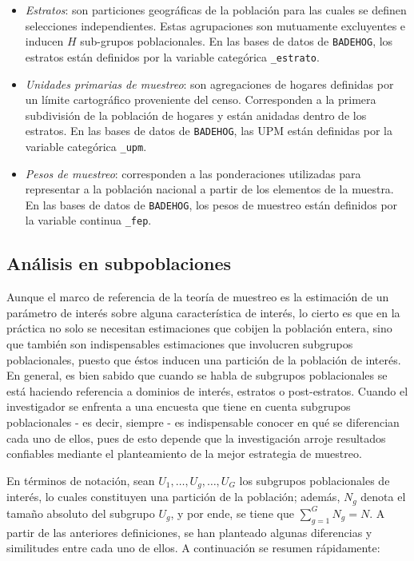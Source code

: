 \documentclass[
  12pt,
  spanish,
]{book}
\providecommand{\tightlist}{%
  \setlength{\itemsep}{0pt}\setlength{\parskip}{0pt}}
\begin{document}
\begin{itemize}
\tightlist
\item
  \emph{Estratos}: son particiones geográficas de la población para las cuales se definen selecciones independientes. Estas agrupaciones son mutuamente excluyentes e inducen \(H\) sub-grupos poblacionales. En las bases de datos de \texttt{BADEHOG}, los estratos están definidos por la variable categórica \texttt{\_estrato}.
\item
  \emph{Unidades primarias de muestreo}: son agregaciones de hogares definidas por un límite cartográfico proveniente del censo. Corresponden a la primera subdivisión de la población de hogares y están anidadas dentro de los estratos. En las bases de datos de \texttt{BADEHOG}, las UPM están definidas por la variable categórica \texttt{\_upm}.
\item
  \emph{Pesos de muestreo}: corresponden a las ponderaciones utilizadas para representar a la población nacional a partir de los elementos de la muestra. En las bases de datos de \texttt{BADEHOG}, los pesos de muestreo están definidos por la variable continua \texttt{\_fep}.
\end{itemize}

\hypertarget{anuxe1lisis-en-subpoblaciones}{%
\subsection{Análisis en subpoblaciones}\label{anuxe1lisis-en-subpoblaciones}}

Aunque el marco de referencia de la teoría de muestreo es la estimación de un parámetro de interés sobre alguna característica de interés, lo cierto es que en la práctica no solo se necesitan estimaciones que cobijen la población entera, sino que también son indispensables estimaciones que involucren subgrupos poblacionales, puesto que éstos inducen una partición de la población de interés. En general, es bien sabido que cuando se habla de subgrupos poblacionales se está haciendo referencia a dominios de interés, estratos o post-estratos. Cuando el investigador se enfrenta a una encuesta que tiene en cuenta subgrupos poblacionales - es decir, siempre - es indispensable conocer en qué se diferencian cada uno de ellos, pues de esto depende que la investigación arroje resultados confiables mediante el planteamiento de la mejor estrategia de muestreo.

En términos de notación, sean \(U_1, \ldots, U_g, \ldots, U_G\) los subgrupos poblacionales de interés, lo cuales constituyen una partición de la población; además, \(N_g\) denota el tamaño absoluto del subgrupo \(U_g\), y por ende, se tiene que \(\sum_{g=1}^G N_g=N\). A partir de las anteriores definiciones, se han planteado algunas diferencias y similitudes entre cada uno de ellos. A continuación se resumen rápidamente:
\end{document}
